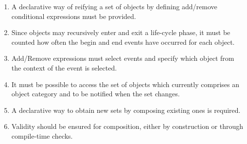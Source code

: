 \begin{enumerate}[{Requirement}1{:}]
\item A declarative way of reifying a set of objects by defining add/remove conditional expressions must be provided.
\item Since objects may recursively enter and exit a life-cycle phase, it must be counted how often the begin and end events have occurred for each object.
\item Add/Remove expressions must select events and specify which object from the context of the event is selected.
\item It must be possible to access the set of objects which currently comprises an object category and to be notified when the set changes.
\item A declarative way to obtain new sets by composing existing ones is required.
\item Validity should be ensured for composition, either by construction or through compile-time checks.
\end{enumerate}

